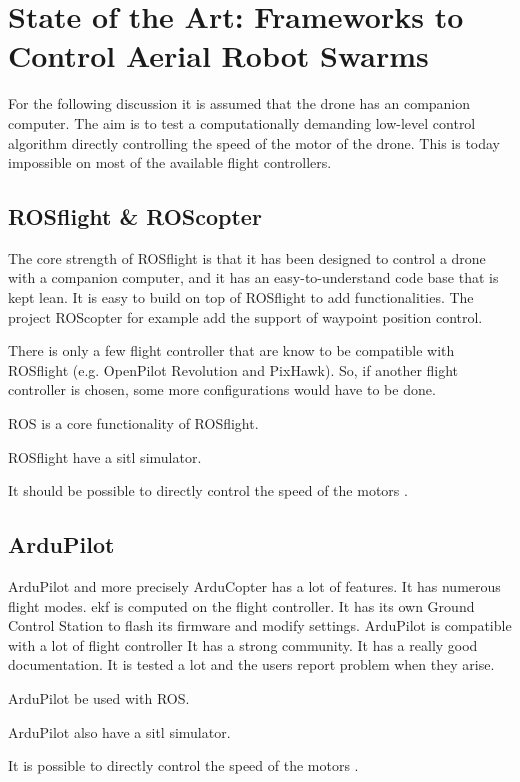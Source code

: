 \chapter{State of the Art: Frameworks to Control Aerial Robot Swarms}

For the following discussion it is assumed that the drone has an companion computer.
The aim is to test a computationally demanding low-level control algorithm directly controlling the speed of the motor of the drone. This is today impossible on most of the available flight controllers.


\section{ROSflight \& ROScopter}
The core strength of ROSflight is that it has been designed to control a drone with a companion computer, and it has an easy-to-understand code base that is kept lean.
It is easy to build on top of ROSflight to add functionalities. The project ROScopter \cite{github_roscopter} for example add the support of waypoint position control.

There is only a few flight controller that are know to be compatible with ROSflight (e.g. OpenPilot Revolution and PixHawk).
So, if another flight controller is chosen, some more configurations would have to be done.

ROS is a core functionality of ROSflight.

ROSflight have a \gls{sitl} simulator.

It should be possible to directly control the speed of the motors \cite{github_rosflight_98}.

\section{ArduPilot}
ArduPilot and more precisely ArduCopter has a lot of features.
It has numerous flight modes.
\Gls{ekf} is computed on the flight controller.
It has its own Ground Control Station to flash its firmware and modify settings.
ArduPilot is compatible with a lot of flight controller
It has a strong community.
It has a really good documentation.
It is tested a lot and the users report problem when they arise.

ArduPilot be used  with ROS.

ArduPilot also have a \gls{sitl} simulator.

It is possible to directly control the speed of the motors \cite{github_ardupilot_11859}.

